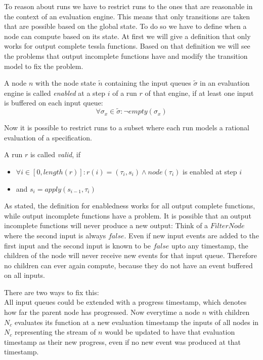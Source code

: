 To reason about runs we have to restrict runs to the ones that are reasonable in the context of an evaluation engine.
This means that only transitions are taken that are possible based on the global state.
To do so we have to define when a node can compute based on its state.
At first we will give a definition that only works for output complete \gls{tessla} functions.
Based on that definition we will see the problems that output incomplete functions have and modify the transition model to fix the problem.

\begin{definition}[name = Enabledness of a Node]\label{def:node_enabled}
  A node \(n\) with the node state \(\widetilde{n}\) containing the input queues \(\widetilde{\sigma}\) in an evaluation engine is called \emph{enabled} at a step \(i\) of a run \(r\) of that engine, if at least one input is buffered on each input queue:
  \[\forall \sigma_x \in \widetilde{\sigma}: \neg \mathit{empty}(\sigma_x)\]
\end{definition}

Now it is possible to restrict runs to a subset where each run models a rational evaluation of a specification.
\clearpage

\begin{definition}[name = Valid Run]\label{def:valid_run}
  A run \(r\) is called \emph{valid}, if
  \begin{itemize}
    \item \(\forall i \in [0,\mathit{length}(r)]: r(i) = (\tau_i,s_i) \land \mathit{node}(\tau_i)\) is enabled at step \(i\)
    \item and \(s_i = \mathit{apply}(s_{i-1}, \tau_i)\)
  \end{itemize}
\end{definition}

As stated, the definition for enabledness works for all output complete functions, while output incomplete functions have a problem.
It is possible that an output incomplete functions will never produce a new output:
Think of a \(\mathit{FilterNode}\) where the second input is always \(\mathit{false}\).
Even if new input events are added to the first input and the second input is known to be \(\mathit{false}\) upto any timestamp, the children of the node will never receive new events for that input queue.
Therefore no children can ever again compute, because they do not have an event buffered on all inputs.

There are two ways to fix this:\\
All input queues could be extended with a progress timestamp, which denotes how far the parent node has progressed.
Now everytime a node \(n\) with children \(N_c\) evaluates its function at a new evaluation timestamp the inputs of all nodes in \(N_c\) representing the stream of \(n\) would be updated to have that evaluation timestamp as their new progress, even if no new event was produced at that timestamp.

